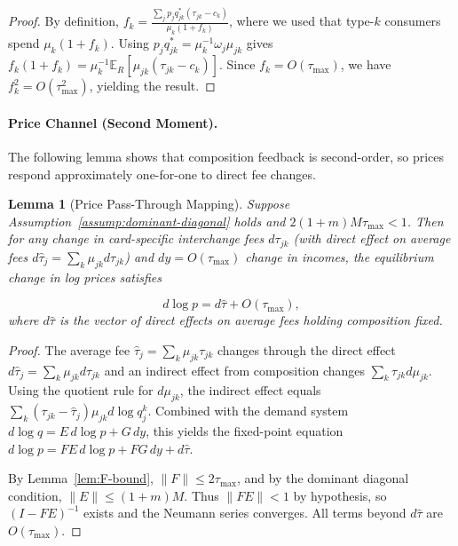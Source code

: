 \documentclass[11pt,english]{article}
\newtheorem{lemma}{Lemma}
\theoremstyle{remark}
\begin{document}
\begin{proof}
By definition, $f_k = \frac{\sum_j p_j q_{jk}^*(\tau_{jk} - c_k)}{\mu_k(1 + f_k)}$, where we used that type-$k$ consumers spend $\mu_k(1+f_k)$.
Using $p_j q_{jk}^* = \mu_k^{-1} \omega_j \mu_{jk}$ gives $f_k(1 + f_k) = \mu_k^{-1} \mathbb{E}_R[\mu_{jk}(\tau_{jk} - c_k)]$.
Since $f_k = O(\tau_{\max})$, we have $f_k^2 = O(\tau_{\max}^2)$, yielding the result.

\end{proof}

\paragraph{Price Channel (Second Moment).}
The following lemma shows that composition feedback is second-order, so prices respond approximately one-for-one to direct fee changes.

\begin{lemma}[Price Pass-Through Mapping]\label{lem:price-mapping}
Suppose Assumption~\ref{assump:dominant-diagonal} holds and $2(1+m)M\tau_{\max} < 1$.
Then for any change in card-specific interchange fees $d\tau_{jk}$ (with direct effect on average fees $d\hat{\tau}_j = \sum_k \mu_{jk} d\tau_{jk}$) and $dy = O(\tau_{\max})$ change in incomes, the equilibrium change in log prices satisfies

\[
d \log p = d\hat{\tau} + O(\tau_{\max}),
\]
where $d\hat{\tau}$ is the vector of direct effects on average fees holding composition fixed.

\end{lemma}

\begin{proof}
The average fee $\hat{\tau}_j = \sum_k \mu_{jk} \tau_{jk}$ changes through the direct effect $d\hat{\tau}_j = \sum_k \mu_{jk} d\tau_{jk}$ and an indirect effect from composition changes $\sum_k \tau_{jk} d\mu_{jk}$.
Using the quotient rule for $d\mu_{jk}$, the indirect effect equals $\sum_k (\tau_{jk} - \hat{\tau}_j) \mu_{jk} d \log q_j^k$.
Combined with the demand system $d \log q = E \, d \log p + G \, dy$, this yields the fixed-point equation $d \log p = FE \, d \log p + FG \, dy + d\hat{\tau}$.

By Lemma~\ref{lem:F-bound}, $\|F\| \leq 2\tau_{\max}$, and by the dominant diagonal condition, $\|E\| \leq (1+m)M$.
Thus $\|FE\| < 1$ by hypothesis, so $(I - FE)^{-1}$ exists and the Neumann series converges.
All terms beyond $d\hat{\tau}$ are $O(\tau_{\max})$.

\end{proof}
\end{document}
